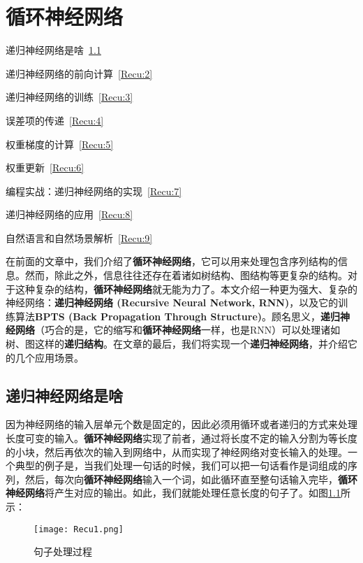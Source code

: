 \chapter{循环神经网络}\label{chap:Recu}

\begin{introduction}
	\item 递归神经网络是啥~\ref{Recu:1}
	\item 递归神经网络的前向计算~\ref{Recu:2}
	\item 递归神经网络的训练~\ref{Recu:3}
	\item 误差项的传递~\ref{Recu:4}
	\item 权重梯度的计算~\ref{Recu:5}
	\item 权重更新~\ref{Recu:6}
	\item 编程实战：递归神经网络的实现~\ref{Recu:7}
	\item 递归神经网络的应用~\ref{Recu:8}
	\item 自然语言和自然场景解析~\ref{Recu:9}
\end{introduction}




在前面的文章中，我们介绍了\textbf{循环神经网络}，它可以用来处理包含序列结构的信息。然而，除此之外，信息往往还存在着诸如树结构、图结构等更复杂的结构。对于这种复杂的结构，\textbf{循环神经网络}就无能为力了。本文介绍一种更为强大、复杂的神经网络：\textbf{递归神经网络 (Recursive Neural Network, RNN)}，以及它的训练算法\textbf{BPTS (Back
	Propagation Through Structure)}。顾名思义，\textbf{递归神经网络}（巧合的是，它的缩写和\textbf{循环神经网络}一样，也是RNN）可以处理诸如树、图这样的\textbf{递归结构}。在文章的最后，我们将实现一个\textbf{递归神经网络}，并介绍它的几个应用场景。

\section{递归神经网络是啥}\label{Recu:1}

因为神经网络的输入层单元个数是固定的，因此必须用循环或者递归的方式来处理长度可变的输入。\textbf{循环神经网络}实现了前者，通过将长度不定的输入分割为等长度的小块，然后再依次的输入到网络中，从而实现了神经网络对变长输入的处理。一个典型的例子是，当我们处理一句话的时候，我们可以把一句话看作是词组成的序列，然后，每次向\textbf{循环神经网络}输入一个词，如此循环直至整句话输入完毕，\textbf{循环神经网络}将产生对应的输出。如此，我们就能处理任意长度的句子了。如图\ref{fig:Recu1}所示：

\begin{figure}[!h]
	\centering
	\texttt{[image: Recu1.png]}
	\caption{句子处理过程}
	\label{fig:Recu1}
\end{figure}

